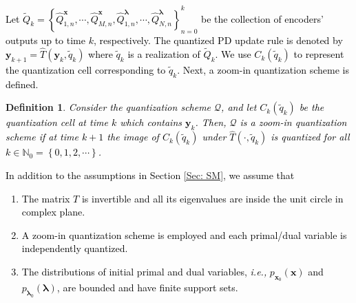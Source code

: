 \documentclass[10pt,twocolumn,twoside]{IEEEtran}
\newtheorem{definition}{Definition}
\begin{document}
\textcolor{black}{Let $\tilde{Q}_k=\left\{\hat{Q}^{{\ensuremath{\boldsymbol{{x}}}}}_{1,n},\cdots,\hat{Q}^{{\ensuremath{\boldsymbol{{x}}}}}_{M,n},\hat{Q}^{{\ensuremath{\boldsymbol{{\lambda}}}}}_{1,n},\cdots,\hat{Q}^{{\ensuremath{\boldsymbol{{\lambda}}}}}_{N,n}\right\}_{n=0}^k$ be the collection of encoders' outputs up to time $k$, respectively. The quantized PD update rule is denoted by ${\ensuremath{\boldsymbol{{y}}}}_{k+1}={\ensuremath{\hat{T}\left({{\ensuremath{\boldsymbol{{y}}}}_k},{\tilde{q}_k}\right)}}$ where $\tilde{q}_k$ is a realization of $\tilde{Q}_k$. We use $C_k{\left({\tilde{q}_k}\right)}$ to represent the quantization cell corresponding to $\tilde{q}_k$. Next, a zoom-in quantization scheme is defined.}
\begin{definition}\label{Def: Zoom-in}
 \textcolor{black}{Consider the quantization scheme $\mathcal{Q}$, and let $C_k{\left({\tilde{q}_k}\right)}$ be the quantization cell at time $k$  which contains ${\ensuremath{\boldsymbol{{y}}}}_k$. Then, $\mathcal{Q}$ is a zoom-in quantization scheme if at time $k+1$ the image of $C_k{\left({\tilde{q}_k}\right)}$ under ${\ensuremath{\hat{T}\left({\cdot},{\tilde{q}_k}\right)}}$ is quantized for all $k\in{\ensuremath{{\ensuremath{\mathbb{{N}}}}}}_0=\left\{0,1,2,\cdots\right\}$.}
\end{definition}

\textcolor{black}{In addition to the assumptions in Section \ref{Sec: SM}, we assume that 
\begin{enumerate}
\item The matrix $T$ is invertible and all its eigenvalues are inside the unit circle in complex plane. 
\item A zoom-in quantization scheme is employed and each primal/dual variable is independently quantized. 
\item The distributions of initial primal and dual variables, \emph{i.e.,} $p_{{\ensuremath{\boldsymbol{{x}}}}_0}{\left({{\ensuremath{\boldsymbol{{x}}}}}\right)}$ and $p_{{\ensuremath{\boldsymbol{{\lambda}}}}_0}{\left({{\ensuremath{\boldsymbol{{\lambda}}}}}\right)}$, are bounded and have  finite support sets.
\end{enumerate} }
\end{document}
